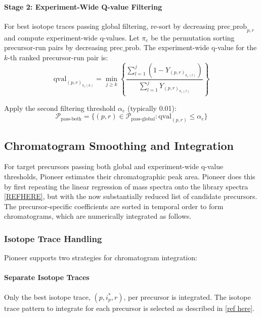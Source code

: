 \documentclass[pdflatex,sn-nature]{sn-jnl}
\begin{document}
\paragraph{Stage 2: Experiment-Wide Q-value Filtering}\label{para:stage2-experiment-wide-qvalue-filtering} For best isotope traces passing global filtering, re-sort by decreasing $\text{prec\_prob}_{p,r}$ and compute experiment-wide q-values. Let $\pi_e$ be the permutation sorting precursor-run pairs by decreasing $\text{prec\_prob}$. The experiment-wide q-value for the $k$-th ranked precursor-run pair is:
\begin{equation}
  \text{qval}_{(p,r)_{\pi_e(k)}} = \min_{j \geq k} \left\{ \frac{\sum_{l=1}^{j} (1 - Y_{(p,r)_{\pi_e(l)}})}{\sum_{l=1}^{j} Y_{(p,r)_{\pi_e(l)}}} \right\}
\end{equation}

Apply the second filtering threshold $\alpha_e$ (typically 0.01):
\begin{equation}
  \mathcal{P}_{\text{pass-both}} = \{(p,r) \in \mathcal{P}_{\text{pass-global}} : \text{qval}_{(p,r)} \leq \alpha_e\}
\end{equation}

\subsection{Chromatogram Smoothing and Integration}\label{subsec:chromatogram-smoothing-integration}

For target precursors passing both global and experiment-wide q-value thresholds, Pioneer estimates their chromatographic peak area. Pioneer does this by first repeating the linear regression of mass spectra onto the library spectra \ref{REFHERE}, but with the now substantially reduced list of candidate precursors. The precursor-specific coefficients are sorted in temporal order to form chromatograms, which are numerically integrated as follows.

\subsubsection{Isotope Trace Handling}\label{subsubsec:isotope-trace-handling}

Pioneer supports two strategies for chromatogram integration:

\paragraph{Separate Isotope Traces}\label{para:separate-isotope-traces} Only the best isotope trace, $(p, i^*_p, r)$, per precursor is integrated. The isotope trace pattern to integrate for each precursor is selected as described in \ref{ref here}.
\end{document}
